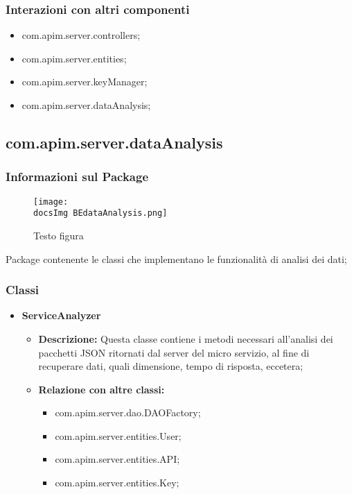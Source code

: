 {{{      \subsubsection{Interazioni con altri componenti}
      \begin{itemize}
      \item com.apim.server.controllers;
      \item com.apim.server.entities;
      \item com.apim.server.keyManager;
      \item com.apim.server.dataAnalysis;
      \end{itemize}
  }
      \subsection{com.apim.server.dataAnalysis}{
  \subsubsection{Informazioni sul Package}
    \begin{figure}[ht]
      \centering
      \texttt{[image: \\docsImg BEdataAnalysis.png]}
      \caption{Testo figura}
      \label{Testo figura}
    \end{figure}
    Package  contenente le classi che implementano le funzionalità di analisi dei dati;
    \subsubsection{Classi}
    \begin{itemize} \itemsep1pt
    \item \textbf{ServiceAnalyzer}
    \begin{itemize}
    \item \textbf{Descrizione:} Questa classe contiene i metodi necessari all'analisi dei pacchetti JSON ritornati dal server del micro servizio, al fine di recuperare dati, quali dimensione, tempo di risposta, eccetera;
    \item \textbf{Relazione con altre classi:}
    \begin{itemize}
    \item com.apim.server.dao.DAOFactory;
    \item com.apim.server.entities.User;
    \item com.apim.server.entities.API;
    \item com.apim.server.entities.Key;
    \end{itemize}
    \end{itemize}
    \end{itemize}
}}}
